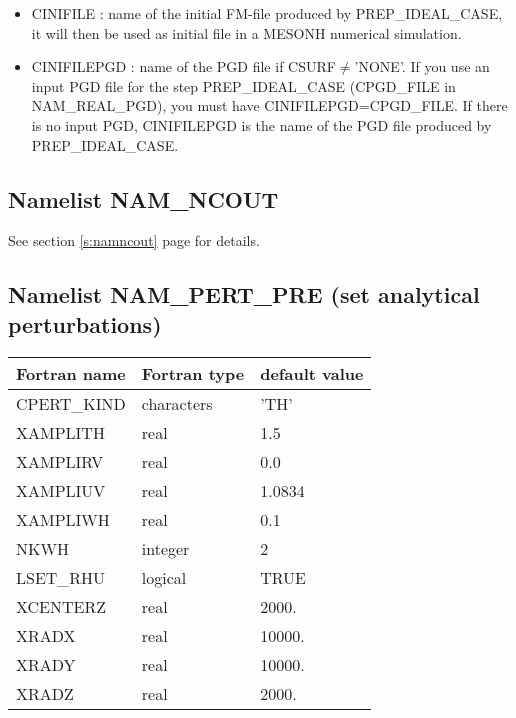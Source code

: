 \begin{itemize}
\item CINIFILE  : name of the initial FM-file  produced by PREP\_IDEAL\_CASE, it will then 
be used as initial file in a MESONH numerical simulation.
\item CINIFILEPGD  : name of the PGD file if CSURF$\neq$'NONE'. If you use an input PGD file for the step PREP\_IDEAL\_CASE (CPGD\_FILE in NAM\_REAL\_PGD), you must have CINIFILEPGD=CPGD\_FILE. If there is no input PGD, CINIFILEPGD is the name of the PGD file produced by PREP\_IDEAL\_CASE.
\end{itemize} 

\subsection{Namelist NAM\_NCOUT}
See section \ref{s:namncout} page \pageref{s:namncout} for details.

\subsection{Namelist NAM\_PERT\_PRE (set analytical perturbations) }

\begin{center}
\begin{tabular} {|l|l|l|}
\hline
Fortran name & Fortran type & default value \\
\hline
CPERT\_KIND         & characters & 'TH'  \\
XAMPLITH            & real       & 1.5   \\
XAMPLIRV            & real       & 0.0   \\
XAMPLIUV            & real       & 1.0834   \\
XAMPLIWH            & real       & 0.1   \\
NKWH                & integer    & 2    \\
LSET\_RHU           & logical    & TRUE \\
XCENTERZ            & real       & 2000. \\
XRADX               & real       & 10000. \\
XRADY               & real       & 10000. \\
XRADZ               & real       & 2000. \\
\hline
\end{tabular}
\end{center}

